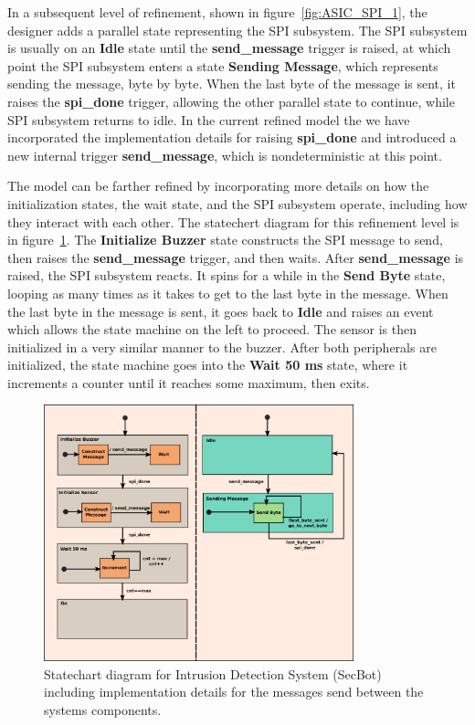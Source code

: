 In a subsequent level of refinement, shown in figure~\ref{fig:ASIC_SPI_1}, the designer adds a parallel state representing the SPI subsystem. The SPI subsystem is usually on an \textbf{Idle} state until the \textbf{send\_message} trigger is raised, at which point the SPI subsystem enters a state \textbf{Sending Message}, which represents sending the message, byte by byte. When the last byte of the message is sent, it raises the \textbf{spi\_done} trigger, allowing the other parallel state to continue, while SPI subsystem returns to idle. In the current refined model the we have incorporated the implementation details for raising \textbf{spi\_done} and introduced a new internal trigger 
\textbf{send\_message}, which is nondeterministic at this point.

The model can be farther refined by incorporating more details on how the initialization states, the wait state, and the SPI subsystem operate, including how they interact with each other. The statechert diagram for this refinement level is in figure~\ref{fig:ASIC_SPI_2}. The \textbf{Initialize Buzzer} state constructs the SPI message to send, then raises the \textbf{send\_message} trigger, and then waits.
After \textbf{send\_message} is raised, the SPI subsystem reacts. It spins for a while in the \textbf{Send Byte} state, looping as many times as it takes to get to the last byte in the message. When the last byte in the message is sent, it goes back to \textbf{Idle} and raises an event which allows the state machine on the left to proceed. The sensor is then initialized in a very similar manner to the buzzer. After both peripherals are initialized, the state machine goes into the \textbf{Wait 50 ms} state, where it increments a counter until it reaches some maximum, then exits.

\begin{figure}[]
  \begin{centering}
  \includegraphics[width=0.8\textwidth]{figures/ASIC&SPI_2}
  \caption{Statechart diagram for Intrusion Detection System (SecBot) including implementation details for the messages send between the systems components.}
  \label{fig:ASIC_SPI_2}
  \end{centering}
\end{figure} 

